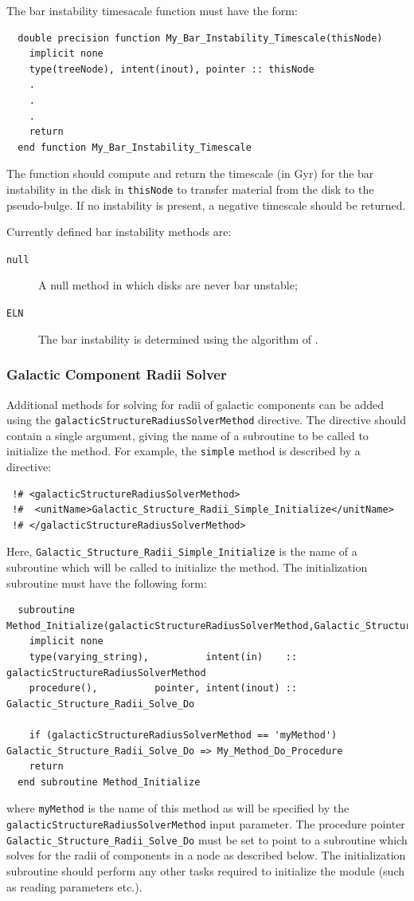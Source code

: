 The bar instability timesacale function must have the form:
\begin{verbatim}
  double precision function My_Bar_Instability_Timescale(thisNode)
    implicit none
    type(treeNode), intent(inout), pointer :: thisNode
    .
    .
    .
    return
  end function My_Bar_Instability_Timescale
\end{verbatim}
The function should compute and return the timescale (in Gyr) for the bar instability in the disk in {\tt thisNode} to transfer material from the disk to the pseudo-bulge. If no instability is present, a negative timescale should be returned.

Currently defined bar instability methods are:
\begin{description}
 \item [{\tt null}] A null method in which disks are never bar unstable;
 \item [{\tt ELN}] The bar instability is determined using the algorithm of \cite{efstathiou_stability_1982}.
\end{description}

\subsubsection{Galactic Component Radii Solver}\label{sec:galactic_radii_solvers}

Additional methods for solving for radii of galactic components can be added using the {\tt galacticStructureRadiusSolverMethod} directive. The directive should contain a single argument, giving the name of a subroutine to be called to initialize the method. For example, the {\tt simple} method is described by a directive:
\begin{verbatim}
 !# <galacticStructureRadiusSolverMethod>
 !#  <unitName>Galactic_Structure_Radii_Simple_Initialize</unitName>
 !# </galacticStructureRadiusSolverMethod>
\end{verbatim}
Here, {\tt Galactic\_Structure\_Radii\_Simple\_Initialize} is the name of a subroutine which will be called to initialize the method. The initialization subroutine must have the following form:
\begin{verbatim}
  subroutine Method_Initialize(galacticStructureRadiusSolverMethod,Galactic_Structure_Radii_Solve_Do)
    implicit none
    type(varying_string),          intent(in)    :: galacticStructureRadiusSolverMethod
    procedure(),          pointer, intent(inout) :: Galactic_Structure_Radii_Solve_Do
    
    if (galacticStructureRadiusSolverMethod == 'myMethod') Galactic_Structure_Radii_Solve_Do => My_Method_Do_Procedure
    return
  end subroutine Method_Initialize
\end{verbatim}
where {\tt myMethod} is the name of this method as will be specified by the {\tt galacticStructureRadiusSolverMethod} input parameter. The procedure pointer {\tt Galactic\_Structure\_Radii\_Solve\_Do} must be set to point to a subroutine which solves for the radii of components in a node as described below. The initialization subroutine should perform any other tasks required to initialize the module (such as reading parameters etc.).

